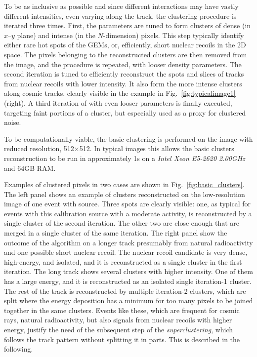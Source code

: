 To be as inclusive as possible and  since different interactions
may have vastly different intensities, even varying along the track,
the clustering procedure is iterated three times.  First, the \dbscan
parameters are tuned to form clusters of dense (in $x$--$y$ plane)
and intense (in the $N$-dimension) pixels.  This step typically
identify either rare hot spots of the GEMs, or, efficiently, short
nuclear recoils in the 2D space. The pixels belonging to the
reconstructed clusters are then removed from the image, and
the \dbscan procedure is repeated, with looser density parameters. The
second iteration is tuned to efficiently reconstruct the \fe spots
and slices of tracks from nuclear recoils with lower intensity. It
also form the more intense clusters along cosmic tracks, clearly
visible in the example in Fig.~\ref{fig:typicalimage1} (right).  A
third iteration of \dbscan with even looser parameters is finally executed,
targeting faint portions of a cluster, but especially  used as a proxy for clustered noise.

To be computationally viable, the \idbscan basic clustering is
performed on the image with reduced resolution, 512$\times$512. In
typical images this allows the basic clusters reconstruction to be run in
approximately 1\unit{s} on a \textit{Intel Xeon E5-2620
2.00\unit{GHz}} and 64\unit{GB} RAM.

Examples of clustered pixels in two cases are shown in
Fig.~\ref{fig:basic_clusters}. The left panel shows an example of
clusters reconstructed on the low-resolution image of one event
with \fe source. Three spots are clearly visible: one, as typical
for events with this calibration source with a moderate activity, is
reconstructed by a single cluster of the second iteration. The other
two are close enough that are merged in a single cluster of the same
iteration. The right panel show the outcome of the \idbscan algorithm
on a longer track presumably from natural radioactivity and one
possible short nuclear recoil.  The nuclear recoil candidate is very
dense, high-energy, and isolated, and it is reconstructed as a single
cluster in the first iteration. The long track shows several clusters
with higher intensity. One of them has a large energy, and it is
reconstructed as an isolated single iteration-1 cluster. The rest of
the track is reconstructed by multiple iteration-2 clusters, which are
split where the energy deposition has a minimum for too many pixels to
be joined together in the same clusters. Events like these, which are
frequent for cosmic rays, natural radioactivity, but also signals from
nuclear recoils with higher energy, justify the need of the subsequent
step of  the \textit{superclustering}, which follows the track pattern
without splitting it in parts. This is described in the following.

